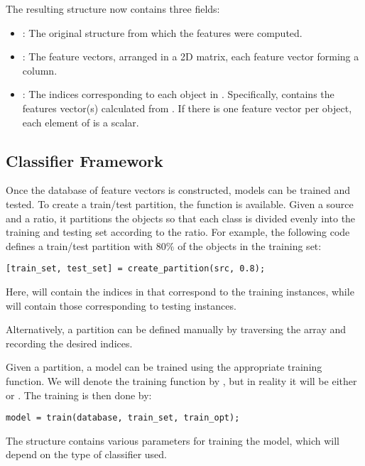 \documentclass{article}
\begin{document}
The resulting  structure now contains three fields:
\begin{itemize}
	\item {}: The original  structure from which the features were computed.
	\item {}: The feature vectors, arranged in a 2D matrix, each feature vector forming a column.
	\item {}: The indices corresponding to each object in . Specifically,  contains the features vector(s) calculated from . If there is one feature vector per object, each element of  is a scalar.
\end{itemize}

\subsection{Classifier Framework}
Once the database of feature vectors is constructed, models can be trained and tested. To create a train/test partition, the function  is available. Given a source  and a ratio, it partitions the objects so that each class is divided evenly into the training and testing set according to the ratio. For example, the following code defines a train/test partition with $80\%$ of the objects in the training set:
\begin{lstlisting}
[train_set, test_set] = create_partition(src, 0.8);
\end{lstlisting}
Here,  will contain the indices in  that correspond to the training instances, while  will contain those corresponding to testing instances.

Alternatively, a partition can be defined manually by traversing the  array and recording the desired indices.

Given a partition, a model can be trained using the appropriate training function. We will denote the training function by , but in reality it will be either  or . The training is then done by:
\begin{lstlisting}
model = train(database, train_set, train_opt);
\end{lstlisting}
The structure  contains various parameters for training the model, which will depend on the type of classifier used.
\end{document}
